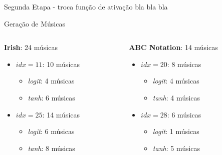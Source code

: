 \documentclass{beamer}
\begin{document}
    \begin{frame}{Segunda Etapa - troca função de ativação}
        bla bla bla
    \end{frame}
    
    \begin{frame}{Geração de Músicas}
        \vspace{-1cm}
        \begin{columns}[onlytextwidth,t]
            \begin{column}{0.48\textwidth}
                \centering
                \textbf{Irish}: 24 músicas
                \vspace{0.1cm}
                \begin{itemize}
                    \item $idx=11$: 10 músicas
                    \begin{itemize}
                        \item \textit{logit}: 4 músicas
                        \item \textit{tanh}: 6 músicas
                    \end{itemize}
                    \vspace{0.25cm}
                    \item $idx=25$: 14 músicas
                    \begin{itemize}
                        \item \textit{logit}: 6 músicas 
                        \item \textit{tanh}: 8 músicas
                    \end{itemize}
                \end{itemize}
            \end{column}

            \begin{column}{0.48\textwidth}
                \centering
                \textbf{ABC Notation}: 14 músicas
                \vspace{0.1cm}
                \begin{itemize}
                    \item $idx=20$: 8 músicas
                    \begin{itemize}
                        \item \textit{logit}: 4 músicas
                        \item \textit{tanh}: 4 músicas
                    \end{itemize}
                    \vspace{0.25cm}
                    \item $idx=28$: 6 músicas
                    \begin{itemize}
                        \item \textit{logit}: 1 músicas
                        \item \textit{tanh}: 5 músicas
                    \end{itemize}
                \end{itemize}
            \end{column}
        \end{columns}
    \end{frame}
    
\end{document}

